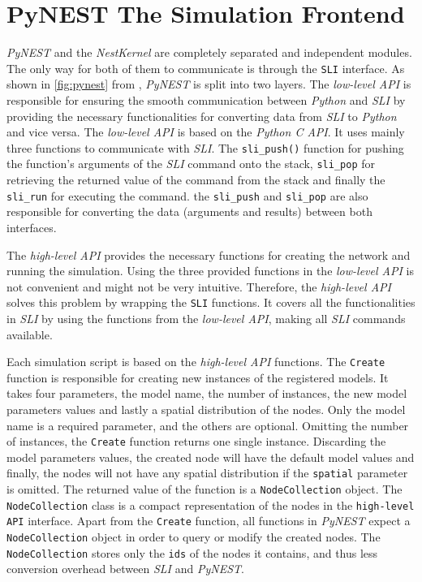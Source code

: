 \section{PyNEST The Simulation Frontend}

\emph{PyNEST} and the \emph{NestKernel} are completely separated and independent modules. The only way for both of them to communicate is through the \texttt{SLI} interface. As shown in \autoref{fig:pynest} from \cite{epp}, \emph{PyNEST} is split into two layers. The \emph{low-level API} is responsible for ensuring the smooth communication between \emph{Python} and \emph{SLI} by providing the necessary functionalities for converting data from \emph{SLI} to \emph{Python} and vice versa. The \emph{low-level API} is based on the \emph{Python C API}. It uses mainly three functions to communicate with \emph{SLI}. The \texttt{sli\_push()} function for pushing the function's arguments of the \emph{SLI} command onto the stack, \texttt{sli\_pop} for retrieving the returned value of the command from the stack and finally the \texttt{sli\_run} for executing the command.  the \texttt{sli\_push} and \texttt{sli\_pop} are also responsible for converting the data (arguments and results) between both interfaces.



 The \emph{high-level API} provides the necessary functions for creating the network and running the simulation. Using the three provided functions in the \emph{low-level API} is not convenient and might not be very intuitive. Therefore, the \emph{high-level API} solves this problem by wrapping the \texttt{SLI} functions. It covers all the functionalities in \emph{SLI} by using the functions from the \emph{low-level API}, making all \emph{SLI} commands available.
 
 Each simulation script is based on the \emph{high-level API} functions. The \texttt{Create} function is responsible for creating new instances of the registered models. It takes four parameters, the model name, the number of instances, the new model parameters values and lastly a spatial distribution of the nodes. Only the model name is a required parameter, and the others are optional. Omitting the number of instances, the \texttt{Create} function returns one single instance. Discarding the model parameters values, the created node will have the default model values and finally, the nodes will not have any spatial distribution if the \texttt{spatial} parameter is omitted. The returned value of the function is a \texttt{NodeCollection} object. The \texttt{NodeCollection} class is a compact representation of the nodes in the \texttt{high-level API} interface. Apart from the \texttt{Create} function, all functions in \emph{PyNEST} expect a \texttt{NodeCollection} object in order to query or modify the created nodes. The \texttt{NodeCollection} stores only the \texttt{ids} of the nodes it contains, and thus less conversion overhead between \emph{SLI} and \emph{PyNEST}. 



